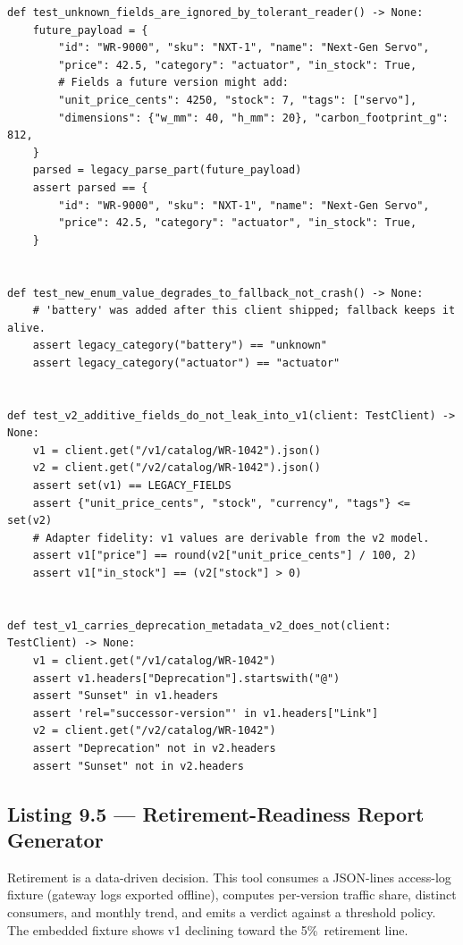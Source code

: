 \begin{verbatim}
def test_unknown_fields_are_ignored_by_tolerant_reader() -> None:
    future_payload = {
        "id": "WR-9000", "sku": "NXT-1", "name": "Next-Gen Servo",
        "price": 42.5, "category": "actuator", "in_stock": True,
        # Fields a future version might add:
        "unit_price_cents": 4250, "stock": 7, "tags": ["servo"],
        "dimensions": {"w_mm": 40, "h_mm": 20}, "carbon_footprint_g": 812,
    }
    parsed = legacy_parse_part(future_payload)
    assert parsed == {
        "id": "WR-9000", "sku": "NXT-1", "name": "Next-Gen Servo",
        "price": 42.5, "category": "actuator", "in_stock": True,
    }


def test_new_enum_value_degrades_to_fallback_not_crash() -> None:
    # 'battery' was added after this client shipped; fallback keeps it alive.
    assert legacy_category("battery") == "unknown"
    assert legacy_category("actuator") == "actuator"


def test_v2_additive_fields_do_not_leak_into_v1(client: TestClient) -> None:
    v1 = client.get("/v1/catalog/WR-1042").json()
    v2 = client.get("/v2/catalog/WR-1042").json()
    assert set(v1) == LEGACY_FIELDS
    assert {"unit_price_cents", "stock", "currency", "tags"} <= set(v2)
    # Adapter fidelity: v1 values are derivable from the v2 model.
    assert v1["price"] == round(v2["unit_price_cents"] / 100, 2)
    assert v1["in_stock"] == (v2["stock"] > 0)


def test_v1_carries_deprecation_metadata_v2_does_not(client: TestClient) -> None:
    v1 = client.get("/v1/catalog/WR-1042")
    assert v1.headers["Deprecation"].startswith("@")
    assert "Sunset" in v1.headers
    assert 'rel="successor-version"' in v1.headers["Link"]
    v2 = client.get("/v2/catalog/WR-1042")
    assert "Deprecation" not in v2.headers
    assert "Sunset" not in v2.headers
\end{verbatim}

\subsection{Listing 9.5 --- Retirement-Readiness Report Generator}
\label{subsec:ch9-listing5}

Retirement is a data-driven decision. This tool consumes a JSON-lines
access-log fixture (gateway logs exported offline), computes per-version
traffic share, distinct consumers, and monthly trend, and emits a verdict
against a threshold policy. The embedded fixture shows v1 declining toward
the 5\%\ retirement line.

